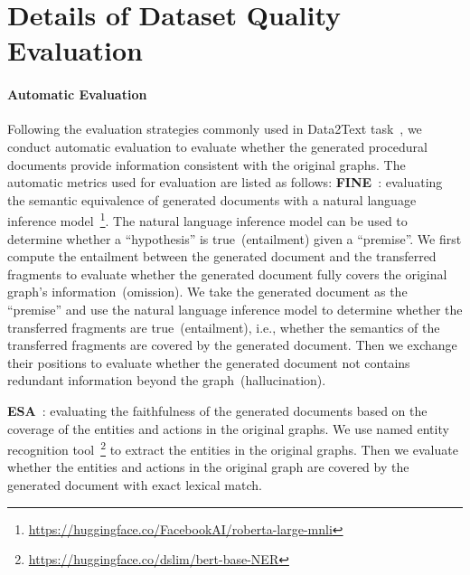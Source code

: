 
\section{Details of Dataset Quality Evaluation
}

\label{app:DatasetQualityEvaluation}

\paragraph{Automatic Evaluation}

\label{app:AutomaticEvaluation}
Following the evaluation strategies commonly used in Data2Text task~\cite{lin2023survey}, we conduct automatic evaluation to evaluate whether the generated procedural documents provide information consistent with the original graphs. The automatic metrics used for evaluation are listed as follows:
%
\textbf{FINE}~\cite{duvsek2020evaluating}: evaluating the semantic equivalence of generated documents with a natural language inference model~\footnote{\url{https://huggingface.co/FacebookAI/roberta-large-mnli}}. The natural language inference model can be used to determine whether a ``hypothesis'' is true~(entailment) given a ``premise''.
We first compute the entailment between the generated document and the transferred fragments to evaluate whether the generated document fully covers the original graph's information~(omission). We take the generated document as the ``premise'' and use the natural language inference model to determine whether the transferred fragments are true~(entailment), i.e., whether the semantics of the transferred fragments are covered by the generated document.
Then we exchange their positions to evaluate whether the generated document not contains redundant information beyond the graph~(hallucination).

\textbf{ESA}~\cite{faille2021entity}: evaluating the faithfulness of the generated documents based on the coverage of the entities and actions in the original graphs. We use named entity recognition tool~\footnote{\url{https://huggingface.co/dslim/bert-base-NER}} to extract the entities in the original graphs. Then we evaluate whether the entities and actions in the original graph are covered by the generated document with exact lexical match.

